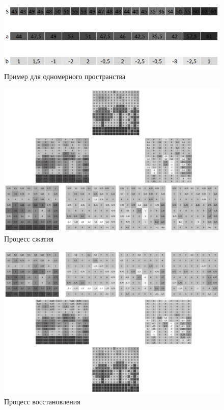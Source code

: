 \begin{figure}[H]
	\begin{center}
		\includegraphics[scale=0.9]{../pics/wavelet/example.png}
		\caption{Пример для одномерного пространства} 
		\label{pic:wavelet_example}
	\end{center}
\end{figure}

\begin{figure}[H]
	\begin{center}
		\includegraphics[scale=0.7]{../pics/wavelet/compression.png}
		\caption{Процесс сжатия} 
		\label{pic:wavelet_compression}
	\end{center}
\end{figure}

\begin{figure}[H]
	\begin{center}
		\includegraphics[scale=0.7]{../pics/wavelet/uncompression.png}
		\caption{Процесс восстановления} 
		\label{pic:wavelet_uncompression}
	\end{center}
\end{figure}

